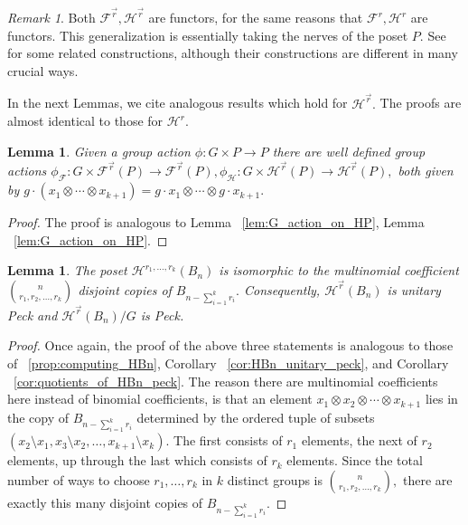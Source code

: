 \documentclass{amsart}
\newtheorem{lem}[thm]{Lemma}
\theoremstyle{remark}
\newtheorem{rem}[thm]{Remark}
\renewcommand{\vec}[1]{\overrightarrow{#1}}
\begin{document}
\begin{rem}
Both $\mathcal F^{\vec r},\mathcal H^{\vec r}$ are functors, for the same reasons that $\mathcal F^r, \mathcal H^r$ are functors. This generalization is essentially taking the nerves of the poset $P.$ See \cite{babson} for some related constructions, although their constructions are different in many crucial ways.
\end{rem}

In the next Lemmas, we cite analogous results which hold for $\mathcal H^{\vec r}.$ The proofs are almost identical to those for $\mathcal H^r.$

\begin{lem}
Given a group action $\phi:G \times P \rightarrow P$ there are well defined group actions $\phi_{\mathcal F}:G\times \mathcal F^{\vec r}(P) \rightarrow \mathcal F^{\vec r}(P),\phi_{\mathcal H}:G\times \mathcal H^{\vec r}(P) \rightarrow \mathcal H^{\vec r}(P),$ 
both given by $g \cdot (x_1\otimes \cdots \otimes x_{k+1}) =g\cdot x_1 \otimes \cdots \otimes g \cdot x_{k+1}.$
\end{lem}
\begin{proof}
The proof is analogous to Lemma ~\ref{lem:G_action_on_HP}, Lemma ~\ref{lem:G_action_on_HP}.
\end{proof}

\begin{lem}
\label{lem:peck_quotients_vector_f}
The poset $\mathcal H^{r_1,\ldots, r_k}(B_n)$ is isomorphic to the multinomial coefficient $\binom n {r_1,r_2,\ldots, r_k}$ disjoint copies of $B_{n- \sum_{i=1}^k r_i}.$ Consequently, $\mathcal H^{\vec r}(B_n)$ is unitary Peck and $\mathcal H^{\vec r}(B_n)/G$ is Peck.
\end{lem}
\begin{proof}
Once again, the proof of the above three statements is analogous to those of ~\ref{prop:computing_HBn}, Corollary ~\ref{cor:HBn_unitary_peck}, and Corollary ~\ref{cor:quotients_of_HBn_peck}. The reason there are multinomial coefficients here instead of binomial coefficients, is that an element $x_1 \otimes x_2 \otimes \cdots \otimes x_{k+1}$ lies in the copy of $B_{n -\sum_{i=1}^k r_i}$ determined by the ordered tuple of subsets $(x_2 \setminus x_1,x_3 \setminus x_2, \ldots, x_{k+1} \setminus x_k).$ The first consists of $r_1$ elements, the next of $r_2$ elements, up through the last which consists of $r_k$ elements. Since the total number of ways to choose $r_1,\ldots, r_k$ in $k$ distinct groups is $\binom n {r_1,r_2,\ldots, r_k},$ there are exactly this many disjoint copies of $B_{n- \sum_{i=1}^k r_i}.$
\end{proof}
\end{document}
